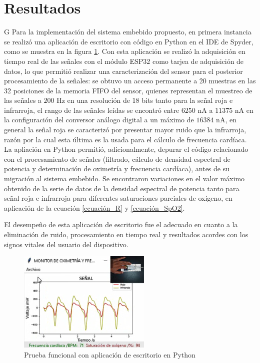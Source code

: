 \documentclass[journal]{IEEEtran}
\begin{document}
\section{Resultados}
{\color{blue}G}
Para la implementación del sistema embebido propuesto, en primera instancia se realizó una aplicación de escritorio con código en Python en el IDE de Spyder, como se muestra en la figura \ref{resultado_python_real}. Con esta aplicación se realizó la adquisición en tiempo real de las señales con el módulo ESP32 como tarjea de adquisición de datos, {\color{green} lo que permitió realizar una caracterización del sensor para el posterior procesamiento de la señales: 
se obtuvo un acceso permanente a 20 muestras en las 32 posiciones de la memoria FIFO del sensor, quienes representan el muestreo de las señales a $200$ Hz en una resolución de 18 bits tanto para la señal roja e infrarroja, el rango de las señales leídas se encontró entre $6250$ nA a $11375$ nA en la configuración del conversor análogo digital a un máximo de $16384$ nA, en general la señal roja se caracterizó por presentar mayor ruido que la infrarroja, razón por la cual esta última es la usada para el cálculo de frecuencia cardíaca.
 }
 La apliación en Python permitió, adicionalmente, depurar el código relacionado con el procesamiento de señales (filtrado, cálculo de densidad espectral de potencia y determinación de oximetría y frecuencia cardíaca), antes de su migración al sistema embebido. {\color{green}Se encontraron variaciones en el valor máximo obtenido de la serie de datos de la densidad espectral de potencia tanto para señal roja e infrarroja para diferentes saturaciones parciales de oxígeno, en aplicación de la ecuación \ref{ecuación_R} y \ref{ecuación_SpO2}.}


El desempeño de esta aplicación de escritorio fue el adecuado en cuanto a la eliminación de ruido, procesamiento en tiempo real y resultados acordes con los signos vitales del usuario del dispositivo.


\begin{figure}[!h]
	\centering
	\includegraphics[width=2.5in]{resultado_python_real.png}
	\caption{Prueba funcional con aplicación de escritorio en Python}
	\label{resultado_python_real}
\end{figure}
\end{document}
